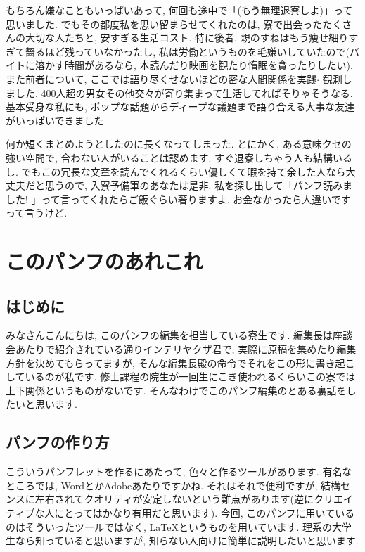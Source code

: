 \documentclass[10pt,b5jsbook,dvips,dvipdfmx,openany]{jsbook}
\theoremstyle{definition}
\begin{document}
	もちろん嫌なこともいっぱいあって, 何回も途中で「(もう無理退寮しよ)」って思いました. でもその都度私を思い留まらせてくれたのは, 寮で出会ったたくさんの大切な人たちと, 安すぎる生活コスト. 特に後者. 親のすねはもう痩せ細りすぎて齧るほど残っていなかったし, 私は労働というものを毛嫌いしていたので(バイトに溶かす時間があるなら, 本読んだり映画を観たり惰眠を貪ったりしたい). また前者について, ここでは語り尽くせないほどの密な人間関係を実践$ \cdot $ 観測しました. 400人超の男女その他交々が寄り集まって生活してればそりゃそうなる. 基本受身な私にも, ポップな話題からディープな議題まで語り合える大事な友達がいっぱいできました. 
	
	何か短くまとめようとしたのに長くなってしまった. とにかく, ある意味クセの強い空間で, 合わない人がいることは認めます. すぐ退寮しちゃう人も結構いるし. でもこの冗長な文章を読んでくれるくらい優しくて暇を持て余した人なら大丈夫だと思うので, 入寮予備軍のあなたは是非. 私を探し出して「パンフ読みました! 」って言ってくれたらご飯ぐらい奢りますよ. お金なかったら人違いですって言うけど. 

	
	
	\section{このパンフのあれこれ}
	
		\subsection{はじめに}
	みなさんこんにちは, このパンフの編集を担当している寮生です. 編集長は座談会あたりで紹介されている通りインテリヤクザ君で, 実際に原稿を集めたり編集方針を決めてもらってますが, そんな編集長殿の命令でそれをこの形に書き起こしているのが私です. 修士課程の院生が一回生にこき使われるくらいこの寮では上下関係というものがないです. そんなわけでこのパンフ編集のとある裏話をしたいと思います. 

		\subsection{パンフの作り方}
		こういうパンフレットを作るにあたって, 色々と作るツールがあります. 有名なところでは, WordとかAdobeあたりですかね. それはそれで便利ですが, 結構センスに左右されてクオリティが安定しないという難点があります(逆にクリエイティブな人にとってはかなり有用だと思います). 今回, このパンフに用いているのはそういったツールではなく, \LaTeX というものを用いています. 理系の大学生なら知っていると思いますが, 知らない人向けに簡単に説明したいと思います. 
		
\end{document}

